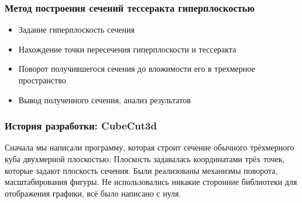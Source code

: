 \documentclass[10pt,pdf,hyperref={unicode}]{beamer}
\begin{document}
\begin{frame}
\begin{frame}
\frametitle{Метод построения сечений тессеракта гиперплоскостью}
	\begin{itemize}
		\item Задание гиперплоскость сечения
		\item Нахождение точки пересечения гиперплоскости и тессеракта
		\item Поворот получившегося сечения до вложимости его в трехмерное пространство
		\item Вывод полученного сечения, анализ результатов
	\end{itemize}
\end{frame}

\begin{frame}
\frametitle{История разработки: {\bf CubeCut3d}}
	Сначала мы написали программу, которая 
	строит сечение обычного трёхмерного куба двухмерной плоскостью.
	Плоскость задавалась координатами трёх точек, которые задают плоскость сечения.
	Были реализованы механизмы поворота, масштабирования фигуры.	
	Не использовались никакие сторонние библиотеки для отображения графики,
	всё было написано с нуля. 
\end{frame}


\end{frame}
\end{document}
